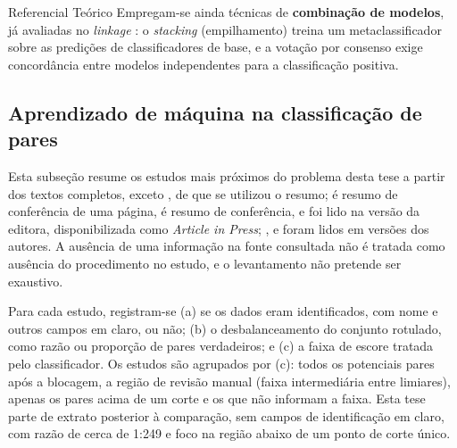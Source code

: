 \begin{chapter}{Referencial Teórico}
Empregam-se ainda técnicas de \textbf{combinação de modelos}, já avaliadas no \textit{linkage} \cite{Sariyar2012ensemble, Vo2019ensemble}: o \textit{stacking} (empilhamento) treina um metaclassificador sobre as predições de classificadores de base, e a votação por consenso exige concordância entre modelos independentes para a classificação positiva.

\subsection{Aprendizado de máquina na classificação de pares}\label{sec:ml-classificacao-pares}

Esta subseção resume os estudos mais próximos do problema desta tese a partir dos textos completos, exceto , de que se utilizou o resumo;  é resumo de conferência de uma página,  é resumo de conferência, e  foi lido na versão da editora, disponibilizada como \textit{Article in Press}; ,  e  foram lidos em versões dos autores. A ausência de uma informação na fonte consultada não é tratada como ausência do procedimento no estudo, e o levantamento não pretende ser exaustivo.

Para cada estudo, registram-se (a) se os dados eram identificados, com nome e outros campos em claro, ou não; (b) o desbalanceamento do conjunto rotulado, como razão ou proporção de pares verdadeiros; e (c) a faixa de escore tratada pelo classificador. Os estudos são agrupados por (c): todos os potenciais pares após a blocagem, a região de revisão manual (faixa intermediária entre limiares), apenas os pares acima de um corte e os que não informam a faixa. Esta tese parte de extrato posterior à comparação, sem campos de identificação em claro, com razão de cerca de 1:249 e foco na região abaixo de um ponto de corte único.


\end{chapter}
